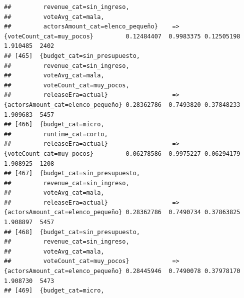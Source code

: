 \documentclass[
]{article}
\begin{document}
\begin{verbatim}
##         revenue_cat=sin_ingreso,                                                                                                
##         voteAvg_cat=mala,                                                                                                       
##         actorsAmount_cat=elenco_pequeño}    => {voteCount_cat=muy_pocos}         0.12484407  0.9983375 0.12505198 1.910485  2402
## [465]  {budget_cat=sin_presupuesto,                                                                                             
##         revenue_cat=sin_ingreso,                                                                                                
##         voteAvg_cat=mala,                                                                                                       
##         voteCount_cat=muy_pocos,                                                                                                
##         releaseEra=actual}                  => {actorsAmount_cat=elenco_pequeño} 0.28362786  0.7493820 0.37848233 1.909683  5457
## [466]  {budget_cat=micro,                                                                                                       
##         runtime_cat=corto,                                                                                                      
##         releaseEra=actual}                  => {voteCount_cat=muy_pocos}         0.06278586  0.9975227 0.06294179 1.908925  1208
## [467]  {budget_cat=sin_presupuesto,                                                                                             
##         revenue_cat=sin_ingreso,                                                                                                
##         voteAvg_cat=mala,                                                                                                       
##         releaseEra=actual}                  => {actorsAmount_cat=elenco_pequeño} 0.28362786  0.7490734 0.37863825 1.908897  5457
## [468]  {budget_cat=sin_presupuesto,                                                                                             
##         revenue_cat=sin_ingreso,                                                                                                
##         voteAvg_cat=mala,                                                                                                       
##         voteCount_cat=muy_pocos}            => {actorsAmount_cat=elenco_pequeño} 0.28445946  0.7490078 0.37978170 1.908730  5473
## [469]  {budget_cat=micro,                                                                                                       

\end{verbatim}
\end{document}
